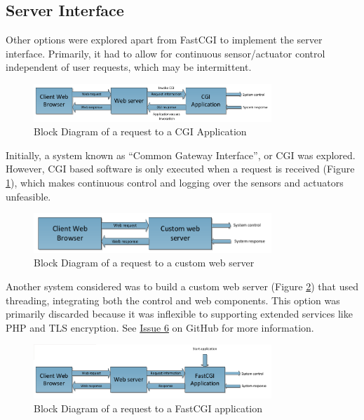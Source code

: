 \subsection{Server Interface} \label{Server Interface}
Other options were explored apart from FastCGI to implement the server interface. Primarily, it had to allow for continuous sensor/actuator control independent of user requests, which may be intermittent.

\begin{figure}[H]
	\centering
	\includegraphics[width=0.8\textwidth]{figures/cgi.png}
	\caption{Block Diagram of a request to a CGI Application} 
	\label{cgi.png}
\end{figure}

Initially, a system known as ``Common Gateway Interface'', or CGI was explored. However, CGI based software is only executed when a request is received (Figure \ref{cgi.png}), which makes continuous control and logging over the sensors and actuators unfeasible. 

\begin{figure}[H]
	\centering
	\includegraphics[width=0.8\textwidth]{figures/custom_webserver.png}
	\caption{Block Diagram of a request to a custom web server} 
	\label{custom_webserver.png}
\end{figure}

Another system considered was to build a custom web server (Figure \ref{custom_webserver.png}) that used threading, integrating both the control and web components. This option was primarily discarded because it was inflexible to supporting extended services like PHP and TLS encryption. See \href{https://github.com/szmoore/MCTX3420/issues/6}{Issue 6} on GitHub for more information.

\begin{figure}[H]
	\centering
	\includegraphics[width=0.8\textwidth]{figures/fastcgi.png}
	\caption{Block Diagram of a request to a FastCGI application} 
	\label{fastcgi.png}
\end{figure}

